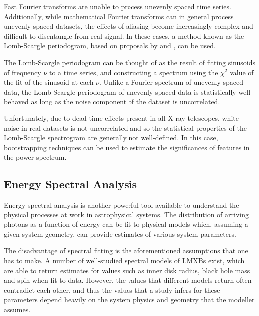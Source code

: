 \par Fast Fourier transforms are unable to process unevenly spaced time series.  Additionally, while mathematical Fourier transforms can in general process unevenly spaced datasets, the effects of aliasing become increasingly complex and difficult to disentangle from real signal.  In these cases, a method known as the Lomb-Scargle periodogram, based on proposals by \citet{Lomb_LombScargle} and \citet{Scargle_LombScargle}, can be used.
\par The Lomb-Scargle periodogram can be thought of as the result of fitting sinusoids of frequency $\nu$ to a time series, and constructing a spectrum using the $\chi^2$ value of the fit of the sinusoid at each $\nu$.  Unlike a Fourier spectrum of unevenly spaced data, the Lomb-Scargle periodogram of unevenly spaced data is statistically well-behaved as long as the noise component of the dataset is uncorrelated.
\par Unfortunately, due to dead-time effects present in all X-ray telescopes, white noise in real datasets is not uncorrelated and so the statistical properties of the Lomb-Scargle spectrogram are generally not well-defined.  In this case, bootstrapping techniques can be used to estimate the significances of features in the power spectrum.

\subsection{Energy Spectral Analysis}

\par Energy spectral analysis is another powerful tool available to understand the physical processes at work in astrophysical systems.  The distribution of arriving photons as a function of energy can be fit to physical models which, assuming a given system geometry, can provide estimates of various system parameters.
\par The disadvantage of spectral fitting is the aforementioned assumptions that one has to make.  A number of well-studied spectral models of LMXBs exist, which are able to return estimates for values such as inner disk radius, black hole mass and spin when fit to data.  However, the values that different models return often contradict each other, and thus the values that a study infers for these parameters depend heavily on the system physics and geometry that the modeller assumes.

